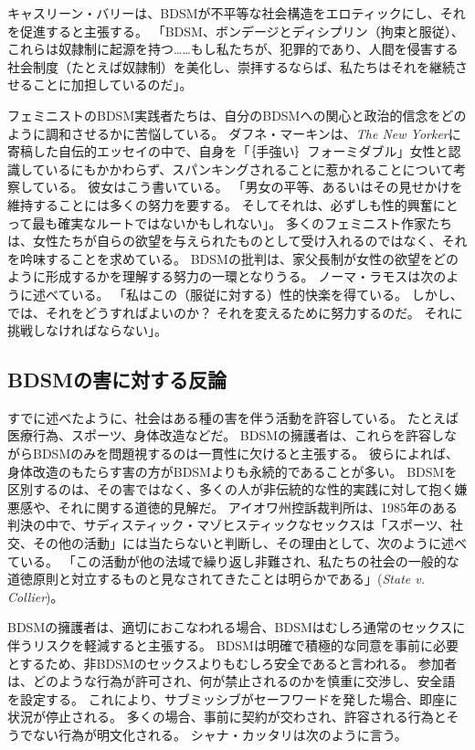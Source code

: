 \documentclass[paper=a4,book,openany]{jlreq}
\newcommand{\ig}[1]{}           %
\begin{document}
キャスリーン・バリー\ig{Barry}は、BDSMが不平等な社会構造をエロティックにし、それを促進すると主張する。
「BDSM、ボンデージとディシプリン（拘束と服従）、これらは奴隷制に起源を持つ……もし私たちが、犯罪的であり、人間を侵害する社会制度（たとえば奴隷制）を美化し、崇拝するならば、私たちはそれを継続させることに加担しているのだ」\citep{murphy12:_part_two_two_part_series_bdsm_femin}。
\ig{Meghan Murphy}

フェミニストのBDSM実践者たちは、自分のBDSMへの関心と政治的信念をどのように調和させるかに苦悩している。
ダフネ・マーキンは、\emph{The New Yorker}に寄稿した自伝的エッセイの中で、自身を「｛手強い｝{フォーミダブル}」女性と認識しているにもかかわらず、スパンキングされることに惹かれることについて考察している。
彼女はこう書いている。
「男女の平等、あるいはその見せかけを維持することには多くの努力を要する。
そしてそれは、必ずしも性的興奮にとって最も確実なルートではないかもしれない」\citep{merkin96:_unlik_obses}。
多くのフェミニスト作家たちは、女性たちが自らの欲望を与えられたものとして受け入れるのではなく、それを吟味することを求めている。
BDSMの批判は、家父長制が女性の欲望をどのように形成するかを理解する努力の一環となりうる。
ノーマ・ラモスは次のように述べている。
「私はこの（服従に対する）性的快楽を得ている。
しかし、では、それをどうすればよいのか？ それを変えるために努力するのだ。
それに挑戦しなければならない」\citep[p.62]{gillespie95:_where_do_we_stand_pornog}。

\subsection{BDSMの害に対する反論}

すでに述べたように、社会はある種の害を伴う活動を許容している。
たとえば医療行為、スポーツ、身体改造などだ。
BDSMの擁護者は、これらを許容しながらBDSMのみを問題視するのは一貫性に欠けると主張する。
彼らによれば、身体改造のもたらす害の方がBDSMよりも永続的であることが多い。
BDSMを区別するのは、その害ではなく、多くの人が非伝統的な性的実践に対して抱く嫌悪感や、それに関する道徳的見解だ。
アイオワ州控訴裁判所は、1985年のある判決の中で、サディスティック・マゾヒスティックなセックスは「スポーツ、社交、その他の活動」には当たらないと判断し、その理由として、次のように述べている。
「この活動が他の法域で繰り返し非難され、私たちの社会の一般的な道徳原則と対立するものと見なされてきたことは明らかである」(\emph{State v. Collier})。

BDSMの擁護者は、適切におこなわれる場合、BDSMはむしろ通常のセックスに伴うリスクを軽減すると主張する。
BDSMは明確で積極的な同意を事前に必要とするため、非BDSMのセックスよりもむしろ安全であると言われる。
参加者は、どのような行為が許可され、何が禁止されるのかを慎重に交渉し、安全語を設定する。
これにより、サブミッシブがセーフワードを発した場合、即座に状況が停止される。
多くの場合、事前に契約が交わされ、許容される行為とそうでない行為が明文化される。
シャナ・カッタリは次のように言う。
\end{document}
